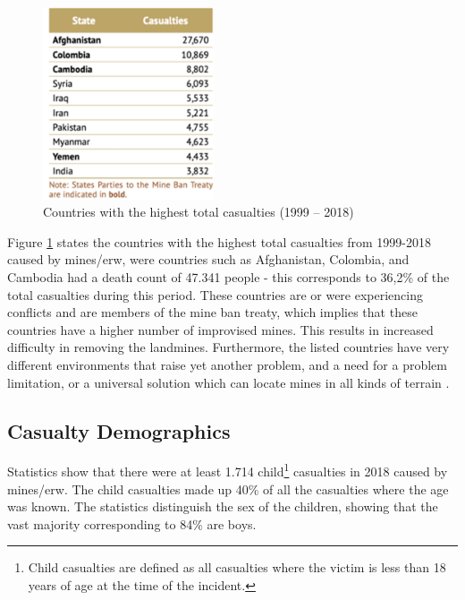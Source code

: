         \vspace{2mm}

\begin{figure}
    \vspace{-5mm}
    \centering
      \includegraphics[width=0.45\textwidth]{00 - Images/casualties_per_country.png}
  \caption{Countries with the highest total casualties (1999 – 2018) \cite{LandmineMonitor2019}}
  \label{fig:casualties_per_country}
\end{figure}

Figure \ref{fig:casualties_per_country} states the countries with the highest total casualties from 1999-2018 caused by mines/\gls{erw}, were countries such as Afghanistan, Colombia, and Cambodia had a death count of 47.341 people - this corresponds to 36,2\% of the total casualties during this period. These countries are or were experiencing conflicts and are members of the mine ban treaty, which implies that these countries have a higher number of improvised mines. This results in increased difficulty in removing the landmines. Furthermore, the listed countries have very different environments that raise yet another problem, and a need for a problem limitation, or a universal solution which can locate mines in all kinds of terrain \cite{LandmineMonitor2019}.

\clearpage

\subsection{Casualty Demographics}
Statistics show that there were at least 1.714 child\footnote{Child casualties are defined as all casualties where the victim is less than 18 years of age at the time of the incident.} casualties in 2018 caused by mines/\gls{erw}. The child casualties made up 40\% of all the casualties where the age was known. The statistics distinguish the sex of the children, showing that the vast majority corresponding to 84\% are boys.

